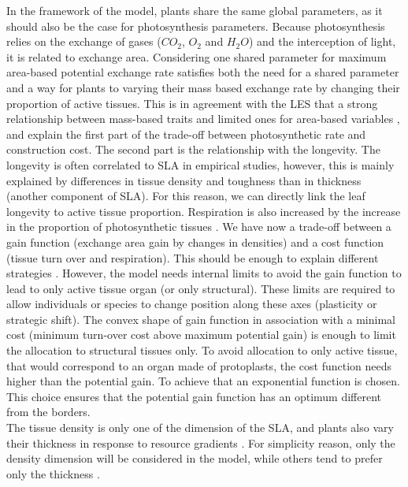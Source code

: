 In the framework of the model, plants share the same global parameters, as it should also be the case for photosynthesis parameters. Because photosynthesis relies on the exchange of gases ($CO_2$, $O_2$ and $H_2O$) and the interception of light, it is related to exchange area. Considering one shared parameter for maximum area-based potential exchange rate satisfies both the need for a shared parameter and a way for plants to varying their mass based exchange rate by changing their proportion of active tissues. This is in agreement with the LES that a strong relationship between mass-based traits and limited ones for area-based variables \parencite{wright_worldwide_2004}, and explain the first part of the trade-off between photosynthetic rate and construction cost. The second part is the relationship with the longevity. The longevity is often correlated to SLA in empirical studies, however, this is mainly explained by differences in tissue density and toughness than in thickness (another component of SLA). For this reason, we can directly link the leaf longevity to active tissue proportion. Respiration is also increased by the increase in the proportion of photosynthetic tissues \parencite{kleidon_global_2000, reich_world-wide_2014}. We have now a trade-off between a gain function (exchange area gain by changes in densities) and a cost function (tissue turn over and respiration). This should be enough to explain different strategies \parencite{westoby_leaf-height-seed_1998}. However, the model needs internal limits to avoid the gain function to lead to only active tissue organ (or only structural). These limits are required to allow individuals or species to change position along these axes (plasticity or strategic shift). The convex shape of gain function in association with a minimal cost (minimum turn-over cost above maximum potential gain) is enough to limit the allocation to structural tissues only. To avoid allocation to only active tissue, that would correspond to an organ made of protoplasts, the cost function needs higher than the potential gain. To achieve that an exponential function is chosen. This choice ensures that the potential gain function has an optimum different from the borders.\\


The tissue density is only one of the dimension of the SLA, and plants also vary their thickness in response to resource gradients \parencite{poorter_causes_2009}. For simplicity reason, only the density dimension will be considered in the model, while others tend to prefer only the thickness \parencite{feller_mathematical_2015}.



